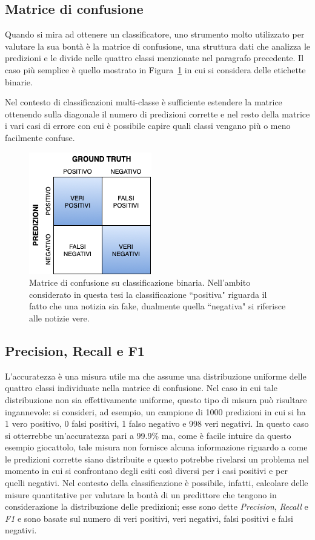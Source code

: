 \documentclass[12pt]{report}
\theoremstyle{definition}
\begin{document}
\subsection{Matrice di confusione}
Quando si mira ad ottenere un classificatore, uno strumento molto utilizzato per valutare la sua bontà è la matrice di confusione, una struttura dati che analizza le predizioni e le divide nelle quattro classi menzionate nel paragrafo precedente. 
Il caso più semplice è quello mostrato in Figura~\ref{confusion} in cui si considera delle etichette binarie.

Nel contesto di classificazioni multi-classe è sufficiente estendere la matrice ottenendo sulla diagonale il numero di predizioni corrette e nel resto della matrice i vari casi di errore con cui è possibile capire quali classi vengano più o meno facilmente confuse. 

\begin{figure}
    \centering
    \includegraphics[scale=0.7]{images/confusion matrix.png}
    \caption{Matrice di confusione su classificazione binaria. Nell'ambito considerato in questa tesi la classificazione ``positiva" riguarda il fatto che una notizia sia fake, dualmente quella ``negativa" si riferisce alle notizie vere.}
    \label{confusion}
\end{figure}

\subsection{Precision, Recall e F1}\label{erroreclass}
L'accuratezza è una misura utile ma che assume una distribuzione uniforme delle quattro classi individuate nella matrice di confusione. Nel caso in cui tale distribuzione non sia effettivamente uniforme, questo tipo di misura può risultare ingannevole: si consideri, ad esempio, un campione di 1000 predizioni in cui si ha 1 vero positivo, 0 falsi positivi, 1 falso negativo e 998 veri negativi. In questo caso si otterrebbe un'accuratezza pari a 99.9\% ma, come è facile intuire da questo esempio giocattolo, tale misura non fornisce alcuna informazione riguardo a come le predizioni corrette siano distribuite e questo potrebbe rivelarsi un problema nel momento in cui si confrontano degli esiti così diversi per i casi positivi e per quelli negativi.
Nel contesto della classificazione è possibile, infatti, calcolare delle misure quantitative per valutare la bontà di un predittore che tengono in considerazione la distribuzione delle predizioni; esse sono dette \textit{Precision}, \textit{Recall} e \textit{F1} e sono basate sul numero di veri positivi, veri negativi, falsi positivi e falsi negativi.
\end{document}

